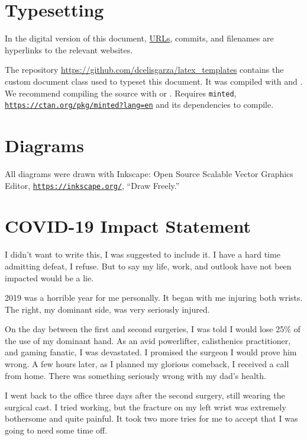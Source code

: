 \section{Typesetting}
\label{s:typeset}

In the digital version of this document, \href{https://www.youtube.com/watch?v=eh7lp9umG2I}{URLs}, commits, and filenames are hyperlinks to the relevant websites.

The repository \href{https://github.com/dcelisgarza/latex_templates}{https://github.com/dcelisgarza/latex\_templates} contains the custom document class used to typeset this document. It was compiled with  and . We recommend compiling the source with  or . Requires \texttt{minted}, \href{https://ctan.org/pkg/minted?lang=en}{\texttt{https://ctan.org/pkg/minted?lang=en}} and its dependencies to compile.
\section{Diagrams}
\label{s:diag}

All diagrams were drawn with Inkscape: Open Source Scalable Vector Graphics Editor, \href{https://inkscape.org/}{\texttt{https://inkscape.org/}}, ``Draw Freely.''

\section{COVID-19 Impact Statement}

I didn't want to write this, I was suggested to include it. I have a hard time admitting defeat, I refuse. But to say my life, work, and outlook have not been impacted would be a lie.

2019 was a horrible year for me personally. It began with me injuring both wrists. The right, my dominant side, was very seriously injured.

On the day between the first and second surgeries, I was told I would lose 25\% of the use of my dominant hand. As an avid powerlifter, calisthenics practitioner, and gaming fanatic, I was devastated. I promised the surgeon I would prove him wrong. A few hours later, as I planned my glorious comeback, I received a call from home. There was something seriously wrong with my dad's health.

I went back to the office three days after the second surgery, still wearing the surgical cast. I tried working, but the fracture on my left wrist was extremely bothersome and quite painful. It took two more tries for me to accept that I was going to need some time off.

